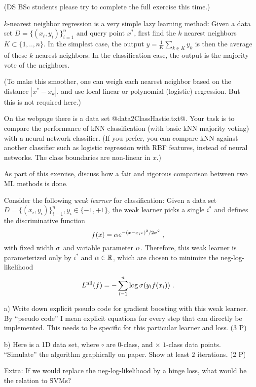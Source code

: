 

\renewcommand{\course}{Machine Learning}
\renewcommand{\exnum}{10}

\exercises
{}
\exercisestitle

(DS BSc students please try to complete the full exercise this time.)



$k$-nearest neighbor regression is a very simple lazy learning method: Given a data set $D=\{(x_i,y_i)\}_{i=1}^n$ and query point $x^*$, first find the $k$ nearest neighbors $K\subset \{1,..,n\}$. In the simplest case, the output $y = \frac{1}{K} \sum_{k\in K} y_k$ is then the average of these $k$ nearest neighbors. In the classification case, the output is the majority vote of the neighbors.

(To make this smoother, one can weigh each nearest neighbor based on the distance $|x^*-x_k|$, and use local linear or polynomial (logistic) regression. But this is not required here.)

On the webpage there is a data set @data2ClassHastie.txt@. Your task is to compare the performance of kNN classification (with basic kNN majority voting) with a neural network classifier. (If you prefer, you can compare kNN against another classifier such as logistic regression with RBF features, instead of neural networks. The class boundaries are non-linear in $x$.)

As part of this exercise, discuss how a fair and rigorous comparison between two ML methods is done.




Consider the following \emph{weak learner} for classification: Given a
data set $D=\{(x_i,y_i)\}_{i=1}^n, y_i\in\{-1,+1\}$, the weak learner
picks a single $i^*$ and defines the discriminative function
$$ f(x) = \alpha e^{-(x-x_{i^*})^2/2\sigma^2} ~, $$
with fixed width $\sigma$ and
variable parameter $\alpha$. Therefore, this weak learner is parameterized
only by $i^*$ and $\alpha\in{\mathbb{R}}$, which are chosen to minimize the
neg-log-likelihood
$$L^\text{nll}(f) = -\sum_{i=1}^n \log \sigma(y_i f(x_i))  ~.$$

a) Write down explicit pseudo code for gradient boosting with
this weak learner. By ``pseudo code'' I mean explicit equations
for every step that can directly be implemented. This needs
to be specific for this particular learner and loss. (3 P)

b) Here is a 1D data set, where $\circ$ are $0$-class, and $\times$
$1$-class data points. ``Simulate'' the algorithm graphically on paper. Show at least $2$ iterations. (2 P)


Extra: If we would replace the neg-log-likelihood by a hinge loss, what
would be the relation to SVMs?

\exerfoot
